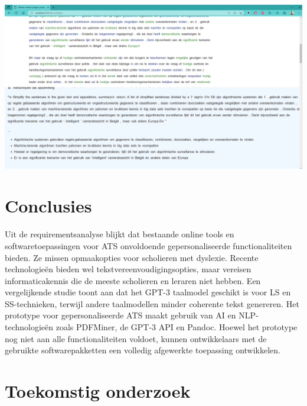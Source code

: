\documentclass[a0,portrait]{hogent-poster}
\begin{document}
\begin{multicols}{2}
\begin{center}
	\captionsetup{type=figure}
	\includegraphics[width=1.0\linewidth]{figures/proto-opsomming-2.png}
	\label{img:figure-1}
\end{center}

\section{Conclusies}

Uit de requirementsanalyse blijkt dat bestaande online tools en softwaretoepassingen voor ATS onvoldoende gepersonaliseerde functionaliteiten bieden. Ze missen opmaakopties voor scholieren met dyslexie. Recente technologieën bieden wel tekstvereenvoudigingsopties, maar vereisen informaticakennis die de meeste scholieren en leraren niet hebben. Een vergelijkende studie toont aan dat het GPT-3 taalmodel geschikt is voor LS en SS-technieken, terwijl andere taalmodellen minder coherente tekst genereren. Het prototype voor gepersonaliseerde ATS maakt gebruik van AI en NLP-technologieën zoals PDFMiner, de GPT-3 API en Pandoc. Hoewel het prototype nog niet aan alle functionaliteiten voldoet, kunnen ontwikkelaars met de gebruikte softwarepakketten een volledig afgewerkte toepassing ontwikkelen. 

\section{Toekomstig onderzoek}


\end{multicols}
\end{document}
